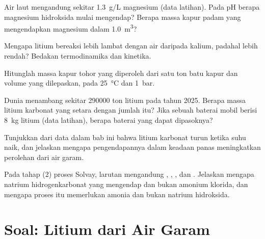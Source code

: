 \begin{exercise}[$\star\star$]\label{exo:b1:s-block:7}
Air laut mengandung sekitar \qty{1.3}{g/L} magnesium (data latihan). Pada
pH berapa magnesium hidroksida mulai mengendap? Berapa massa kapur padam
yang mengendapkan magnesium dalam \qty{1.0}{m^3}?
\end{exercise}

\begin{exercise}[$\star\star$]\label{exo:b1:s-block:8}
Mengapa litium bereaksi lebih lambat dengan air daripada kalium, padahal
 lebih rendah? Bedakan termodinamika dan kinetika.
\end{exercise}

\begin{exercise}[$\star\star$]\label{exo:b1:s-block:9}
Hitunglah massa kapur tohor yang diperoleh dari satu ton batu kapur dan
volume  yang dilepaskan, pada \qty{25}{\celsius} dan \qty{1}{bar}.
\end{exercise}

\begin{exercise}[$\star\star\star$]\label{exo:b1:s-block:10}
Dunia menambang sekitar \num{290000} ton litium pada tahun 2025. Berapa
massa litium karbonat yang setara dengan jumlah itu? Jika sebuah baterai
mobil berisi \qty{8}{kg} litium (data latihan), berapa baterai yang dapat
dipasoknya?
\end{exercise}

\begin{exercise}[$\star\star\star$]\label{exo:b1:s-block:11}
Tunjukkan dari data dalam bab ini bahwa  litium karbonat turun
ketika suhu naik, dan jelaskan mengapa pengendapannya dalam keadaan panas
meningkatkan perolehan dari air garam.
\end{exercise}

\begin{exercise}[$\star\star\star$]\label{exo:b1:s-block:12}
Pada tahap (2) proses Solvay, larutan mengandung , ,
, dan . Jelaskan mengapa natrium hidrogenkarbonat yang
mengendap dan bukan amonium klorida, dan mengapa proses itu memerlukan
amonia dan bukan natrium hidroksida.
\end{exercise}

\section{Soal: Litium dari Air Garam}

